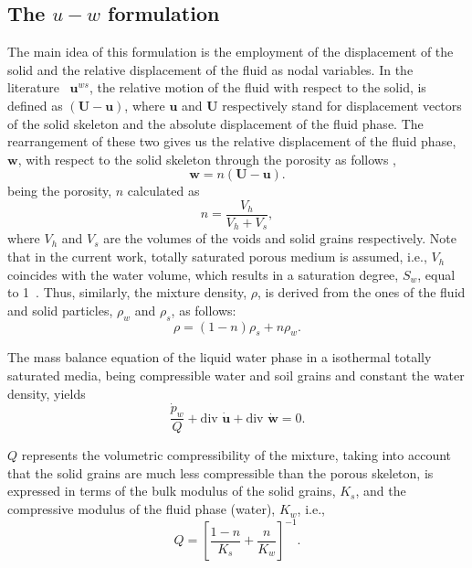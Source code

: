 \documentclass[preprint,12pt,a4paper]{elsarticle}
\begin{document}
\subsection{The $u-w$ formulation}
\label{subsec:21}
The main idea of this formulation is the employment of the displacement of the solid and the relative displacement of the fluid as nodal variables. In the literature~\cite{LewisSchrefler98} $\boldsymbol{u}^{ws}$, the relative motion of the fluid with respect to the solid, is defined as $\boldsymbol{  \left(U-u\right) }$, where $\boldsymbol{u}$ and  $\boldsymbol{U}$ respectively stand for displacement vectors of the solid skeleton and the absolute displacement of the fluid phase. The rearrangement of these two gives us the relative displacement of the fluid phase, $\boldsymbol{w}$, with respect to the solid skeleton through the porosity as follows \cite{LopezQuerol2008},
\begin{equation}\label{eq_uw1}
\boldsymbol{ w }=n \boldsymbol{  \left(U-u\right) }.
\end{equation}
being the porosity, $n$ calculated as
\begin{equation}\label{eq_uw3}
n= \frac{V_h}{V_h+V_s},
\end{equation}
where $V_h$ and $V_s$ are the volumes of the voids and solid grains respectively. 
Note that in the current work,   totally saturated porous medium is assumed, i.e., $V_h$ coincides with the water volume, which results in a saturation degree, $S_w$, equal to 1~\cite{LewisSchrefler98}. Thus, similarly, the mixture density, $\rho$, is derived from the ones of the fluid and solid particles, $\rho_w$ and $\rho_s$, as follows:
\begin{equation}\label{eq_uw2}
\rho=(1-n) \rho_s + n \rho_{w}.
\end{equation}

The mass balance equation of the liquid water phase in a isothermal totally saturated media, being compressible water and soil grains and constant the water density, yields ~\cite{LewisSchrefler98}
\begin{equation}
\frac{\dot{ p}_w}{Q} +  \mbox{div }  \boldsymbol{\dot{u}} + \mbox{div } \boldsymbol{\dot{w}} = 0 \label{eq_uw10}.
\end{equation}

  $Q$ represents the volumetric compressibility of the mixture, taking into account that the solid grains are much less compressible than the porous skeleton, is expressed in terms of the bulk modulus of the solid grains, $K_s$, and the compressive modulus of the fluid phase (water), $K_w$, \cite{Zienkiewicz99} i.e.,
 \begin{equation}\label{eq_uw4}
Q = \left[ \frac{1-n}{K_s} + \frac{n}{K_w} \right]^{-1}.
\end{equation}
\end{document}
